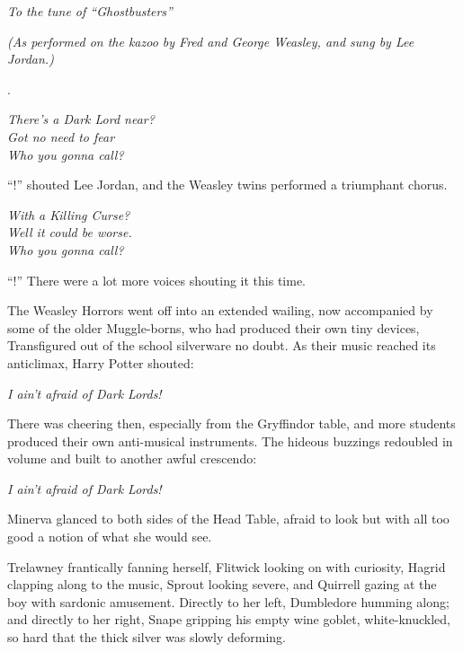 \begin{center}
\emph{To the tune of “Ghostbusters”}

\emph{(As performed on the kazoo by Fred and George Weasley, and sung by Lee Jordan.)}

.

\emph{There’s a Dark Lord near?\\
Got no need to fear\\
Who you gonna call?}
\end{center}

“!” shouted Lee Jordan, and the Weasley twins performed a triumphant chorus.

\begin{center}
\emph{With a Killing Curse?\\
Well it could be worse.\\
Who you gonna call?}
\end{center}

“!” There were a lot more voices shouting it this time.

The Weasley Horrors went off into an extended wailing, now accompanied by some of the older Muggle-borns, who had produced their own tiny devices, Transfigured out of the school silverware no doubt. As their music reached its anticlimax, Harry Potter shouted:

\begin{center}
\emph{I ain’t afraid of Dark Lords!}
\end{center}

There was cheering then, especially from the Gryffindor table, and more students produced their own anti-musical instruments. The hideous buzzings redoubled in volume and built to another awful crescendo:

\begin{center}
\emph{I ain’t afraid of Dark Lords!}
\end{center}

Minerva glanced to both sides of the Head Table, afraid to look but with all too good a notion of what she would see.

Trelawney frantically fanning herself, Flitwick looking on with curiosity, Hagrid clapping along to the music, Sprout looking severe, and Quirrell gazing at the boy with sardonic amusement. Directly to her left, Dumbledore humming along; and directly to her right, Snape gripping his empty wine goblet, white-knuckled, so hard that the thick silver was slowly deforming.

